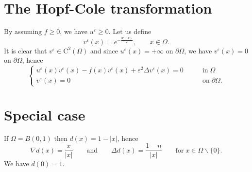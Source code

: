 \documentclass[10pt]{article}
\theoremstyle{plain}
\theoremstyle{remark}
\begin{document}
\section{The Hopf-Cole transformation}
By assuming $f\geq 0$, we have $u^\varepsilon\geq 0$. Let us define
\begin{equation*}
    v^\varepsilon(x) = e^{-\frac{u^\varepsilon(x)}{\varepsilon}}, \qquad x\in \Omega.
\end{equation*}
It is clear that $v^\varepsilon\in \mathrm{C}^2(\Omega)$ and since $u^\varepsilon(x) = +\infty$ on $\partial\Omega$, we have $v^\varepsilon(x) = 0$ on $\partial\Omega$, hence
\begin{equation*}
    \begin{cases}
    u^\varepsilon(x)v^\varepsilon(x) - f(x)v^\varepsilon(x) +\varepsilon^2 \Delta v^\varepsilon(x)= 0 &\qquad\text{in}\;\Omega\\
    v^\varepsilon(x) = 0 &\qquad\text{on}\;\partial\Omega.
    \end{cases}
\end{equation*}

\section{Special case}
If $\Omega = B(0,1)$ then $d(x) = 1-|x|$, hence 
\begin{equation*}
    \nabla d(x) = \frac{x}{|x|} \qquad\text{and}\qquad \Delta d(x) = \frac{1-n}{|x|} \qquad \text{for}\;x\in \Omega\backslash \{0\}.
\end{equation*}
We have $d(0)=1$.
{}
%

\end{document}
